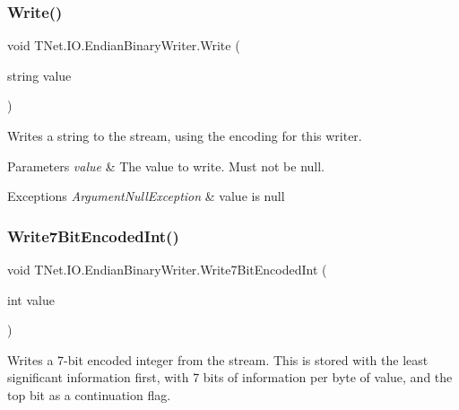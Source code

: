 \subsubsection{\texorpdfstring{Write()}{Write()}\hspace{0.1cm}{\footnotesize\ttfamily [17/17]}}
{\footnotesize\ttfamily void T\+Net.\+I\+O.\+Endian\+Binary\+Writer.\+Write (\begin{DoxyParamCaption}\item[{string}]{value }\end{DoxyParamCaption})}



Writes a string to the stream, using the encoding for this writer. 


\begin{DoxyParams}{Parameters}
{\em value} & The value to write. Must not be null.\\
\hline
\end{DoxyParams}

\begin{DoxyExceptions}{Exceptions}
{\em Argument\+Null\+Exception} & value is null\\
\hline
\end{DoxyExceptions}
\mbox{\label{class_t_net_1_1_i_o_1_1_endian_binary_writer_aa472b542d540fc5d4cf03003f475c718}} 
\subsubsection{\texorpdfstring{Write7\+Bit\+Encoded\+Int()}{Write7BitEncodedInt()}}
{\footnotesize\ttfamily void T\+Net.\+I\+O.\+Endian\+Binary\+Writer.\+Write7\+Bit\+Encoded\+Int (\begin{DoxyParamCaption}\item[{int}]{value }\end{DoxyParamCaption})}



Writes a 7-\/bit encoded integer from the stream. This is stored with the least significant information first, with 7 bits of information per byte of value, and the top bit as a continuation flag. 


